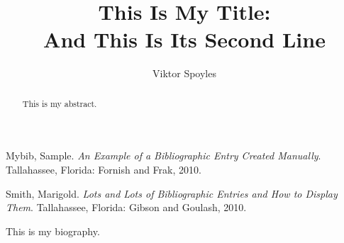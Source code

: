 \documentclass[11pt,expanded,copyright]{fsuthesis}
\title{This Is My Title:\protect\\And This Is Its Second Line}
\author{Viktor Spoyles}
\begin{document}
\frontmatter
\maketitle
\makecommitteepage



\tableofcontents



\begin{abstract}
This is my abstract.
\end{abstract}

\mainmatter


%
%

%


\begin{references}
Mybib, Sample. \textit{An Example of a Bibliographic Entry
 Created Manually}. Tallahassee, Florida: Fornish and Frak, 2010.

Smith, Marigold. \textit{Lots and Lots of Bibliographic Entries
 and How to Display Them}. Tallahassee, Florida: Gibson and Goulash, 2010.
\end{references}



\begin{biosketch}
This is my biography.
\end{biosketch}
\end{document}
